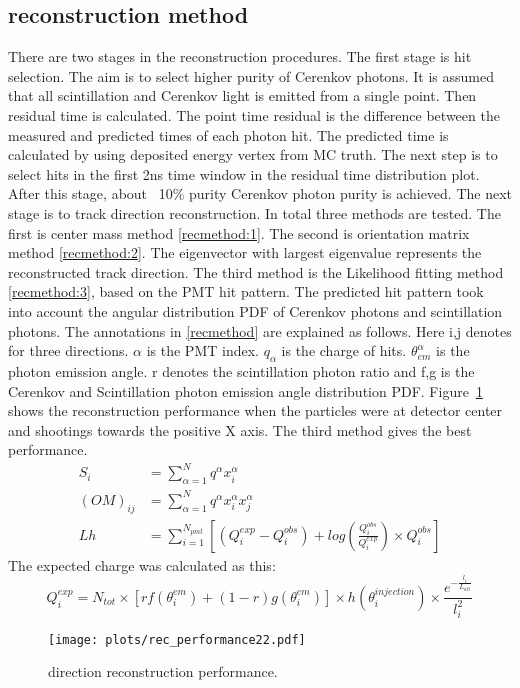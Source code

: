 \documentclass[a4paper,10pt]{cpc-hepnp}
\begin{document}
\subsection{reconstruction method}
There are two stages in the reconstruction procedures. The first stage is hit
selection. The aim is to select higher purity of Cerenkov photons. It is
assumed that all scintillation and Cerenkov light is emitted from a single
point. Then residual time is calculated. The point time residual is the
difference between the measured and predicted times of each photon hit.
The predicted time is calculated by using deposited energy vertex from MC truth. The next step
is to select hits in the first 2ns time window in the residual time
distribution plot. After this stage, about ~10\% purity Cerenkov photon purity
is achieved. The next stage is to track direction reconstruction. In total
three methods are tested. The first is center mass method
\eqref{recmethod:1}. The second is orientation matrix method
\eqref{recmethod:2}. The eigenvector with largest eigenvalue represents the
reconstructed track direction. The third method is the Likelihood fitting
method \eqref{recmethod:3}, based on the PMT hit pattern. The predicted hit
pattern took into account the angular distribution PDF of Cerenkov
photons and scintillation photons. The annotations in \eqref{recmethod} are
explained as follows.
Here i,j denotes for three directions. $\alpha$ is the PMT index. $q_{\alpha}$ is the
charge of hits. $\theta_{em}^{\alpha}$  is the photon emission angle. r denotes
the scintillation photon ratio and f,g is the Cerenkov and Scintillation photon
emission angle distribution PDF. Figure~\ref{rec_performance} shows the
reconstruction performance when the particles were at detector center and
shootings towards the positive X axis. The third method gives the best
performance.
\begin{subequations}\label{recmethod}
\begin{align}
\label{recmethod:1}
S_{i} & = \sum_{\alpha=1}^{N}q^{\alpha}x_{i}^{\alpha}
\\
\label{recmethod:2}
(OM)_{ij} & = \sum_{\alpha=1}^{N}q^{\alpha}x_{i}^{\alpha}x_{j}^{\alpha}
\\
\label{recmethod:3}
Lh &= \sum_{i=1}^{N_{pmt}}[(Q^{exp}_{i}-Q^{obs}_{i})+log(\frac{Q^{obs}_{i}}{Q^{exp}_{i}}){\times}Q^{obs}_{i}]
\end{align}
\end{subequations}
The expected charge was calculated as this:
\begin{equation*}
Q^{exp}_{i} = N_{tot}\times[rf(\theta^{em}_{i})+(1-r)g(\theta^{em}_{i})]{\times}h(\theta^{injection}_{i})\times\frac{e^{-\frac{l_i}{L_{att}}}}{l_i^2}
\end{equation*}
\begin{figure}[htbp]
\centering %
\texttt{[image: plots/rec\_performance22.pdf]}
\caption{\label{rec_performance} direction reconstruction performance.}
\end{figure}
\end{document}

